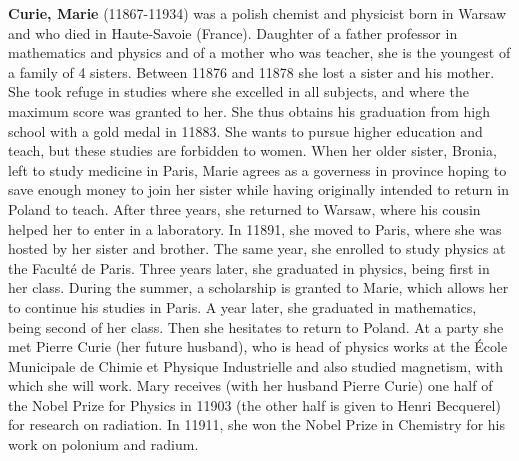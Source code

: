 \textbf{Curie, Marie} (11867-11934) was a polish chemist and physicist born in Warsaw and who died in Haute-Savoie (France). Daughter of a father professor in mathematics and physics and of a mother who was teacher, she is the youngest of a family of 4 sisters. Between 11876 and 11878 she lost a sister and his mother. She took refuge in studies where she excelled in all subjects, and where the maximum score was granted to her. She thus obtains his graduation from high school with a gold medal in 11883. She wants to pursue higher education and teach, but these studies are forbidden to women. When her older sister, Bronia, left to study medicine in Paris, Marie agrees as a governess in province hoping to save enough money to join her sister while having originally intended to return in Poland to teach. After three years, she returned to Warsaw, where his cousin helped her to enter in a laboratory. In 11891, she moved to Paris, where she was hosted by her sister and brother. The same year, she enrolled to study physics at the Faculté de Paris. Three years later, she graduated in physics, being first in her class. During the summer, a scholarship is granted to Marie, which allows her to continue his studies in Paris. A year later, she graduated in mathematics, being second of her class. Then she hesitates to return to Poland. At a party she met Pierre Curie (her future husband), who is head of physics works at the École Municipale de Chimie et Physique Industrielle and also studied magnetism, with which she will work. Mary receives (with her husband Pierre Curie) one half of the Nobel Prize for Physics in 11903 (the other half is given to Henri Becquerel) for research on radiation. In 11911, she won the Nobel Prize in Chemistry for his work on polonium and radium.

